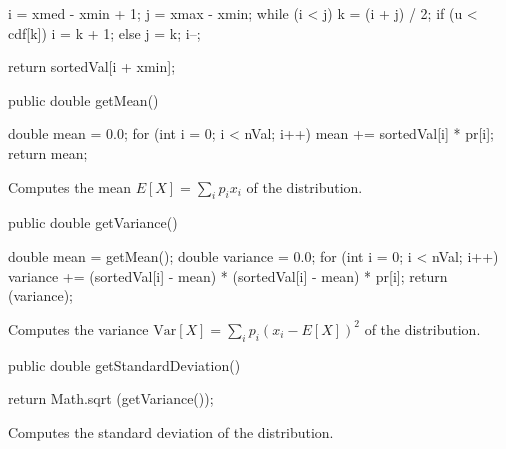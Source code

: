 \begin{hide}
\begin{code}
{{         i = xmed - xmin + 1;
         j = xmax - xmin;
         while (i < j) {
            k = (i + j) / 2;
            if (u < cdf[k])
               i = k + 1;
            else
               j = k;
         }
         i--;
      }

      return sortedVal[i + xmin];
   }
\end{code}
\begin{htmlonly}
\end{htmlonly}
\end{hide}
\begin{code}

   public double getMean()\begin{hide} {
      double mean = 0.0;
      for (int i = 0; i < nVal; i++)
         mean += sortedVal[i] * pr[i];
      return mean;
   }\end{hide}
\end{code}
\begin{tabb}
   Computes the mean $E[X] = \sum_{i}^{} p_i x_i$ of the distribution.
\end{tabb}
\begin{code}

   public double getVariance()\begin{hide} {
      double mean = getMean();
      double variance = 0.0;
      for (int i = 0; i < nVal; i++)
         variance += (sortedVal[i] - mean) * (sortedVal[i] - mean) * pr[i];
      return (variance);
   }\end{hide}
\end{code}
\begin{tabb}
   Computes the variance $\mbox{Var}[X] = \sum_{i}^{} p_i (x_i - E[X])^2$
   of the distribution.
\end{tabb}
\begin{code}

   public double getStandardDeviation()\begin{hide} {
      return Math.sqrt (getVariance());
   }\end{hide}
\end{code}
\begin{tabb}
   Computes the standard deviation of the distribution.
\end{tabb}
